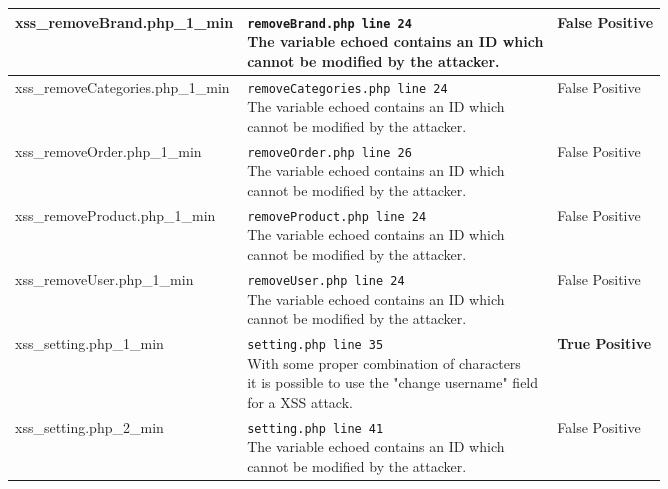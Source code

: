 \documentclass[11pt]{article}
\begin{document}
\begin{longtable}[H]{| p{} | p{} | p{} |}
	 	\hline
	  	xss\_removeBrand.php\_1\_min 	
	  	& \makecell{ \texttt{removeBrand.php line 24} \\
				The variable echoed contains an ID which \\
			 	cannot be modified by the attacker.}
	 	& False Positive\\

	 	\hline
	  	xss\_removeCategories.php\_1\_min 	
	  	& \makecell{ \texttt{removeCategories.php line 24} \\
				The variable echoed contains an ID which \\
			 	cannot be modified by the attacker.}
	 	& False Positive\\
	 	
	 	\hline
	  	xss\_removeOrder.php\_1\_min 	
	  	& \makecell{ \texttt{removeOrder.php line 26} \\
				The variable echoed contains an ID which \\
			 	cannot be modified by the attacker.}
	 	& False Positive\\

	 	\hline
	  	xss\_removeProduct.php\_1\_min 	
	  	& \makecell{ \texttt{removeProduct.php line 24} \\
				The variable echoed contains an ID which \\
			 	cannot be modified by the attacker.}
	 	& False Positive\\

	 	\hline
	  	xss\_removeUser.php\_1\_min 	
	  	& \makecell{ \texttt{removeUser.php line 24} \\
					The variable echoed contains an ID which \\
			 	cannot be modified by the attacker.} 
	 	& False Positive\\


	 	\hline
	  	xss\_setting.php\_1\_min 	
	  	& \makecell{ \texttt{setting.php line 35} \\
				With some proper combination of characters \\ 
				it is possible to use the "change username" field \\ 
				 for a XSS attack.}  
	 	& \textbf{True Positive}\\

	 	\hline
	  	xss\_setting.php\_2\_min 	
	  	& \makecell{ \texttt{setting.php line 41} \\
				The variable echoed contains an ID which \\
			 	cannot be modified by the attacker.}
	 	& False Positive\\


\end{longtable}
\end{document}
